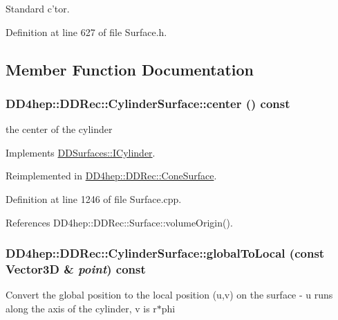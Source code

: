 Standard c'tor. 

Definition at line 627 of file Surface.h.

\subsection{Member Function Documentation}
\hypertarget{class_d_d4hep_1_1_d_d_rec_1_1_cylinder_surface_a2f781fa234e46d60caa6d07271c2e922}{
\subsubsection[{center}]{ DD4hep::DDRec::CylinderSurface::center () const}}
\label{class_d_d4hep_1_1_d_d_rec_1_1_cylinder_surface_a2f781fa234e46d60caa6d07271c2e922}


the center of the cylinder 

Implements \hyperlink{class_d_d_surfaces_1_1_i_cylinder_acebccc0b84cc5b7e53bb2e56fb991f16}{DDSurfaces::ICylinder}.

Reimplemented in \hyperlink{class_d_d4hep_1_1_d_d_rec_1_1_cone_surface_abfdad3ecbda7070c2b2b4b4d48b23ccb}{DD4hep::DDRec::ConeSurface}.

Definition at line 1246 of file Surface.cpp.

References DD4hep::DDRec::Surface::volumeOrigin().\hypertarget{class_d_d4hep_1_1_d_d_rec_1_1_cylinder_surface_ad5772b2599d37ee4280dc074873aef40}{
\subsubsection[{globalToLocal}]{ DD4hep::DDRec::CylinderSurface::globalToLocal (const {\bf Vector3D} \& {\em point}) const}}
\label{class_d_d4hep_1_1_d_d_rec_1_1_cylinder_surface_ad5772b2599d37ee4280dc074873aef40}
Convert the global position to the local position (u,v) on the surface -\/ u runs along the axis of the cylinder, v is r$\ast$phi 

